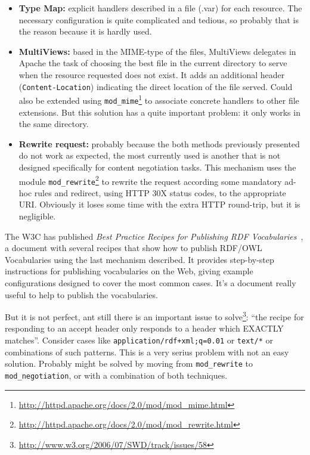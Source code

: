 \begin{itemize}

  \item \textbf{Type Map:} explicit handlers described in a file (.var) for each 
        resource. The necessary configuration is quite complicated and tedious, 
        so probably that is the reason because it is hardly used.

  \item \textbf{MultiViews:} based in the MIME-type of the files, MultiViews 
        delegates in Apache the task of choosing the best file in the current 
        directory to serve when the resource requested does not exist. It adds 
        an additional header (\texttt{Content-Location}) indicating the direct 
        location of the file served. Could also be extended using 
        \texttt{mod\_mime}\footnote{\url{http://httpd.apache.org/docs/2.0/mod/mod_mime.html}}
        to associate concrete handlers to other file extensions. But this solution
        has a quite important problem: it only works in the same directory.

  \item \textbf{Rewrite request:} probably because the both methods previously 
        presented do not work as expected, the most currently used is another 
        that is not designed specifically for content negotiation tasks. This
        mechanism uses the module 
        \texttt{mod\_rewrite}\footnote{\url{http://httpd.apache.org/docs/2.0/mod/mod_rewrite.html}}
        to rewrite the request according some mandatory ad-hoc rules and redirect,
        using HTTP 30X status codes, to the appropriate URI. Obviously it loses 
        some time with the extra HTTP round-trip, but it is negligible.

\end{itemize}

The W3C has published \textit{Best Practice Recipes for Publishing RDF Vocabularies}~\cite{Recipes},
a document with several recipes that show how to publish RDF/OWL Vocabularies using
the last mechanism described. It provides step-by-step instructions for publishing 
vocabularies on the Web, giving example configurations designed to cover the most 
common cases. It's a document really useful to help to publish the vocabularies.

But it is not perfect, ant still there is an important issue to 
solve\footnote{\url{http://www.w3.org/2006/07/SWD/track/issues/58}}: 
``the recipe for responding to an accept header only responds to a header which
EXACTLY matches''. Consider cases like \texttt{application/rdf+xml;q=0.01} or 
\texttt{text/*} or combinations of such patterns. This is a very serius problem
with not an easy solution. Probably might be solved by moving from \texttt{mod\_rewrite}
to \texttt{mod\_negotiation}, or with a combination of both techniques.

